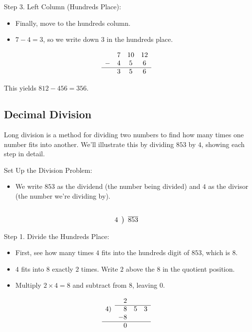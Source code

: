 \vspace{\baselineskip}\par
Step 3. Left Column (Hundreds Place):
 \begin{itemize}
   \item Finally, move to the hundreds column.
   \item \( 7 - 4 = 3 \), so we write down 3 in the hundreds place.
   \end{itemize}
\[
\begin{array}{cccc}
    & 7 & 10 & 12 \\ %
  - & 4 & 5 & 6 \\
  \hline
    & 3 & 5 & 6 \\
\end{array}
\]

This yields \( 812 - 456 = 356 \).



\subsection{Decimal Division}
Long division is a method for dividing two numbers to find how many times one number fits into another. We’ll illustrate this by dividing \( 853 \) by \( 4 \), showing each step in detail.

\vspace{\baselineskip}\par
Set Up the Division Problem:
 \begin{itemize}
    \item We write \( 853 \) as the dividend (the number being divided) and \( 4 \) as the divisor (the number we’re dividing by).
    \end{itemize}

\[
\begin{array}{r@{\hskip\arraycolsep}c@{\hskip\arraycolsep}l}
&  & \\
4 &\big)& \overline{853} \\
\end{array}
\]

\vspace{\baselineskip}\par
Step 1. Divide the Hundreds Place:
 \begin{itemize}
    \item First, see how many times \( 4 \) fits into the hundreds digit of \( 853 \), which is \( 8 \).
    \item \( 4 \) fits into \( 8 \) exactly \( 2 \) times. Write \( 2 \) above the \( 8 \) in the quotient position.
    \item Multiply \( 2 \times 4 = 8 \) and subtract from \( 8 \), leaving \( 0 \).
    \end{itemize}
\[
\begin{array}{rrrr}
       & 2 &   &  \\
       \cline{2-4}
    4) & 8 & 5 & 3 \\
       & -8 &  &    \\
\hline
    & 0 \\
\end{array}
\]

